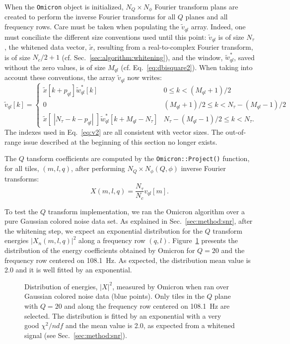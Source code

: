 When the \texttt{Omicron} object is initialized, $N_Q\times N_{\phi}$ Fourier transform plans are created to perform the inverse Fourier transforms for all $Q$ planes and all frequency rows. Care must be taken when populating the $\tilde{v}_{ql}$ array. Indeed, one must conciliate the different size conventions used until this point: $\tilde{v}_{ql}$ is of size $N_\tau $, the whitened data vector, $\tilde{x}$, resulting from a real-to-complex Fourier transform, is of size $N_c/2+1$ (cf. Sec.~\ref{sec:algorithm:whitening}), and the window, $\tilde{w}^*_{ql}$, saved without the zero values, is of size $M_{ql}$ (cf. Eq.~\ref{eq:dbisquare2}). When taking into account these conventions, the array $\tilde{v}_{ql}$ now writes:
\begin{equation}
  \tilde{v}_{ql}[k] =
  \begin{cases}
    \tilde{x}[k+p_{ql}]\tilde{w}_{ql}^*[k]                     & 0 \le k < (M_{ql}+1)/2 \\
    0                                                        & (M_{ql}+1)/2 \le k < N_\tau-(M_{ql}-1)/2 \\
    \tilde{x}[\;|N_\tau-k-p_{ql}|\;]\tilde{w}_{ql}^*[k+M_{ql}-N_\tau] & N_\tau-(M_{ql}-1)/2 \le k < N_\tau.
  \end{cases}
  \label{eq:v2}
\end{equation}
The indexes used in Eq.~\ref{eq:v2} are all consistent with vector sizes. The out-of-range issue described at the beginning of this section no longer exists.

The $Q$ tansform coefficients are computed by the \texttt{Omicron::Project()} function, for all tiles, $(m,l,q)$, after performing $N_Q\times N_{\phi}(Q,\phi)$ inverse Fourier transforms:
\begin{equation}
  X(m, l, q) = \frac{N_\tau}{N_c} v_{ql}[m].
  \label{eq:qcoeff}
\end{equation}

To test the $Q$ transform implementation, we ran the Omicron algorithm over a pure Gaussian colored noise data set. As explained in Sec.~\ref{sec:method:snr}, after the whitening step, we expect an exponential distribution for the $Q$ transform energies $|X_n(m, l, q)|^2$ along a frequency row $(q,l)$. Figure~\ref{fig:noise_energy_gaus} presents the distribution of the energy coefficients obtained by Omicron for $Q=20$ and the frequency row centered on 108.1~Hz. As expected, the distribution mean value is 2.0 and it is well fitted by an exponential.
\begin{figure}
  \center
  \caption{Distribution of energies, $|X|^2$, measured by Omicron when ran over Gaussian colored noise data (blue points).  Only tiles in the $Q$ plane with $Q=20$ and along the frequency row centered on 108.1~Hz are selected. The distribution is fitted by an exponential with a very good $\chi^2/ndf$ and the mean value is 2.0, as expected from a whitened signal (see Sec.~\ref{sec:method:snr}).}
  \label{fig:noise_energy_gaus}
\end{figure}

